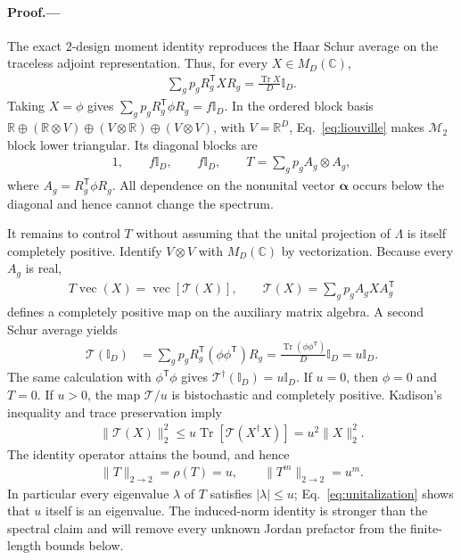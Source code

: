 \documentclass[aps,prl,reprint,superscriptaddress,nofootinbib]{revtex4-2}
\newcommand{\Tr}{\operatorname{Tr}}
\newcommand{\id}{\mathbb{I}}
\newcommand{\cM}{\mathcal{M}}
\newcommand{\cT}{\mathcal{T}}
\newcommand{\vct}{\operatorname{vec}}
\begin{document}
\paragraph{Proof.---}
The exact $2$-design moment identity reproduces the Haar Schur average on the
traceless adjoint representation.  Thus, for every $X\in M_D(\mathbb C)$,
\begin{align}
 \sum_g p_g R_g^{\mathsf T}X R_g
 =\frac{\Tr X}{D}\id_D.
 \label{eq:firsttwirl}
\end{align}
Taking $X=\phi$ gives $\sum_g p_gR_g^{\mathsf T}\phi R_g=f\id_D$.
In the ordered block basis
$\mathbb R\oplus(\mathbb R\otimes V)\oplus(V\otimes\mathbb R)
\oplus(V\otimes V)$, with $V=\mathbb R^D$, Eq.~\eqref{eq:liouville} makes
$\cM_2$ block lower triangular.  Its diagonal blocks are
\begin{align}
 1,\qquad f\id_D,\qquad f\id_D,\qquad
 T=\sum_g p_g A_g\otimes A_g,
 \label{eq:blocks}
\end{align}
where $A_g=R_g^{\mathsf T}\phi R_g$.  All dependence on the nonunital vector
$\bm{\alpha}$ occurs below the diagonal and hence cannot change the spectrum.

It remains to control $T$ without assuming that the unital projection of
$\Lambda$ is itself completely positive.  Identify $V\otimes V$ with
$M_D(\mathbb C)$ by vectorization.  Because every $A_g$ is real,
\begin{align}
 T\vct(X)=\vct[\cT(X)],
 \qquad
 \cT(X)=\sum_g p_g A_g X A_g^{\mathsf T}
 \label{eq:auxmap}
\end{align}
defines a completely positive map on the auxiliary matrix algebra.  A second
Schur average yields
\begin{align}
 \cT(\id_D)
 &=\sum_g p_g R_g^{\mathsf T}
   (\phi\phi^{\mathsf T})R_g
 =\frac{\Tr(\phi\phi^{\mathsf T})}{D}\id_D
 =u\id_D.
 \label{eq:unitalization}
\end{align}
The same calculation with $\phi^{\mathsf T}\phi$ gives
$\cT^\dagger(\id_D)=u\id_D$.  If $u=0$, then $\phi=0$ and $T=0$.  If $u>0$,
the map $\cT/u$ is bistochastic and completely positive.  Kadison's
inequality and trace preservation imply
\begin{align}
 \lVert\cT(X)\rVert_2^2
 \leq u\Tr[\cT(X^\dagger X)]
 =u^2\lVert X\rVert_2^2.
 \label{eq:hscontraction}
\end{align}
The identity operator attains the bound, and hence
\begin{align}
 \lVert T\rVert_{2\to2}=\rho(T)=u,
 \qquad \lVert T^m\rVert_{2\to2}=u^m.
 \label{eq:radiusT}
\end{align}
In particular every eigenvalue $\lambda$ of $T$ satisfies
$|\lambda|\leq u$; Eq.~\eqref{eq:unitalization} shows that $u$ itself is an
eigenvalue.  The induced-norm identity is stronger than the spectral claim
and will remove every unknown Jordan prefactor from the finite-length bounds
below.
\end{document}
